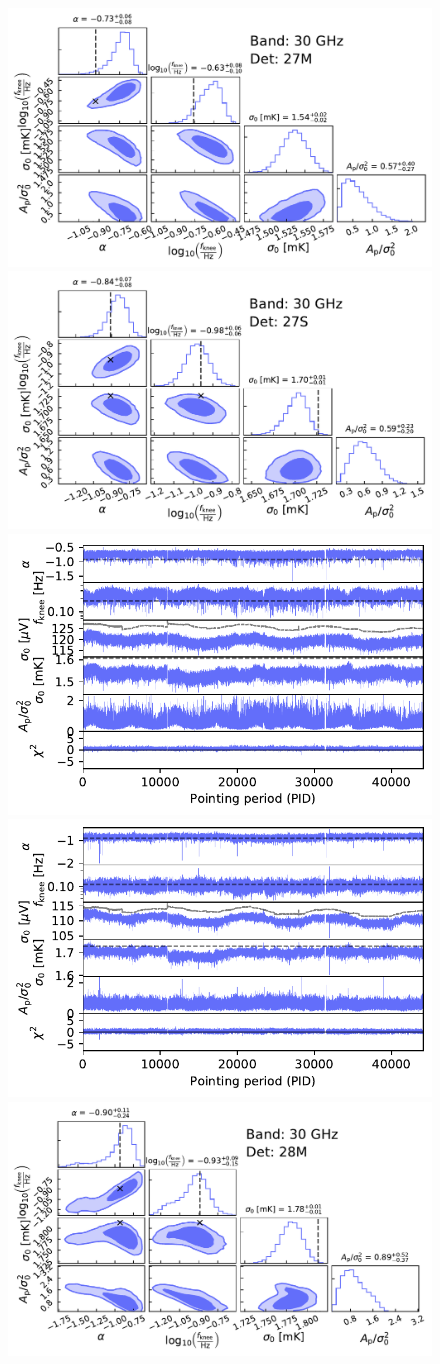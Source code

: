 \documentclass{aa}
\begin{document}
\begin{figure}[p]
  \begin{center}
    \includegraphics[width=0.495\linewidth]{figs/corner_band_030_det_1_mean_new.pdf}
    \includegraphics[width=0.495\linewidth]{figs/corner_band_030_det_2_mean_new.pdf}\\
    \includegraphics[width=0.495\linewidth]{figs/xi_vs_pid_band_030_det_1_mean_new.pdf}
    \includegraphics[width=0.495\linewidth]{figs/xi_vs_pid_band_030_det_2_mean_new.pdf}\\
    \vspace*{1mm}
    \includegraphics[width=0.495\linewidth]{figs/corner_band_030_det_3_mean_new.pdf}

\end{center}
\end{figure}
\end{document}
